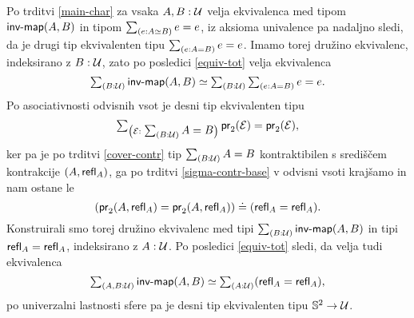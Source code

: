 \begin{dokaz}
  Po trditvi \ref{main-char} za vsaka \(A, B : \mathcal{U}\) velja ekvivalenca med tipom \(\textnormal{\textsf{inv-map}}(A, B)\) in tipom \(\textstyle \sum_{\left( e : A \simeq B \right)} e = e\), iz aksioma univalence pa nadaljno sledi, da je drugi tip ekvivalenten tipu \(\textstyle \sum_{\left( e : A = B \right)} e = e\). Imamo torej družino ekvivalenc, indeksirano z \(B : \mathcal{U}\), zato po posledici \ref{equiv-tot} velja ekvivalenca
  \[\textstyle \sum_{\left( B : \mathcal{U} \right)} \textnormal{\textsf{inv-map}}(A, B) \simeq \textstyle \sum_{\left( B : \mathcal{U} \right)} \textstyle \sum_{\left( e : A = B \right)} e = e.\]
  Po asociativnosti odvisnih vsot je desni tip ekvivalenten tipu
  \[\textstyle \sum_{\left( \mathcal{E} : \textstyle \sum_{\left( B : \mathcal{U} \right)} A = B \right)} \textnormal{\textsf{pr}}_{2}(\mathcal{E}) = \textnormal{\textsf{pr}}_{2}(\mathcal{E}),\]
  ker pa je po trditvi \ref{cover-contr} tip \(\textstyle \sum_{\left( B : \mathcal{U} \right)} A = B\) kontraktibilen s središčem kontrakcije \((A, \textnormal{\textsf{refl}}_{A})\), ga po trditvi \ref{sigma-contr-base} v odvisni vsoti krajšamo in nam ostane le
  \[(\textnormal{\textsf{pr}}_{2}(A, \textnormal{\textsf{refl}}_{A}) = \textnormal{\textsf{pr}}_{2}(A, \textnormal{\textsf{refl}}_{A})) \doteq (\textnormal{\textsf{refl}}_{A} = \textnormal{\textsf{refl}}_{A}).\]
  Konstruirali smo torej družino ekvivalenc med tipi \(\textstyle \sum_{\left( B : \mathcal{U} \right)} \textnormal{\textsf{inv-map}}(A, B)\)
  in tipi \(\textnormal{\textsf{refl}}_{A} = \textnormal{\textsf{refl}}_{A}\), indeksirano z \(A : \mathcal{U}\). Po posledici \ref{equiv-tot} sledi, da velja tudi ekvivalenca
  \[\textstyle \sum_{\left( A, B : \mathcal{U} \right)} \textnormal{\textsf{inv-map}}(A, B) \simeq \textstyle \sum_{\left( A : \mathcal{U} \right)} (\textnormal{\textsf{refl}}_{A} = \textnormal{\textsf{refl}}_{A}),\]
  po univerzalni lastnosti sfere pa je desni tip ekvivalenten tipu \(\mathbb{S}^{2} \to \mathcal{U}\).
\end{dokaz}

